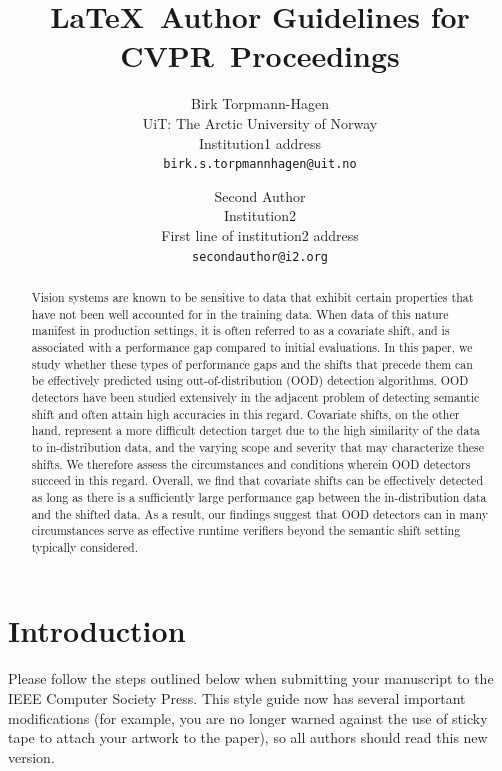 \documentclass[10pt,twocolumn,letterpaper]{article}
\def\confName{CVPR}
\begin{document}
\title{\LaTeX\ Author Guidelines for \confName~Proceedings}

\author{Birk Torpmann-Hagen\\
UiT: The Arctic University of Norway\\
Institution1 address\\
{\tt\small birk.s.torpmannhagen@uit.no}
\and
Second Author\\
Institution2\\
First line of institution2 address\\
{\tt\small secondauthor@i2.org}
}
\maketitle

\begin{abstract}
    Vision systems are known to be sensitive to data that exhibit certain properties that have not been well accounted for in the training data. When data of this nature manifest in production settings, it is often referred to as a covariate shift, and is associated with a performance gap compared to initial evaluations. In this paper, we study whether these types of performance gaps and the shifts that precede them can be effectively predicted using out-of-distribution (OOD) detection algorithms. OOD detectors have been studied extensively in the adjacent problem of detecting semantic shift and often attain high accuracies in this regard. Covariate shifts, on the other hand, represent a more difficult detection target due to the high similarity of the data to in-distribution data, and the varying scope and severity that may characterize these shifts. We therefore assess the circumstances and conditions wherein OOD detectors succeed in this regard. Overall, we find that covariate shifts can be effectively detected as long as there is a sufficiently large performance gap between the in-distribution data and the shifted data. As a result, our findings suggest that OOD detectors can in many circumstances serve as effective runtime verifiers beyond the semantic shift setting typically considered. 
\end{abstract}

\section{Introduction}\label{sec:intro}

Please follow the steps outlined below when submitting your manuscript to the IEEE Computer Society Press.
This style guide now has several important modifications (for example, you are no longer warned against the use of sticky tape to attach your artwork to the paper), so all authors should read this new version.
\end{document}
